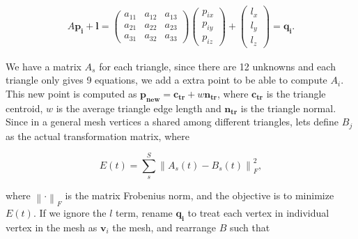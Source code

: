 \documentclass[12pt]{article}
\begin{document}
\begin{align*}
A \mathbf{p_i} + \mathbf{l} = \begin{pmatrix}
 a_{11} & a_{12} & a_{13} \\ 
 a_{21} & a_{22} & a_{23} \\ 
 a_{31} & a_{32}  & a_{33} 
\end{pmatrix} 
\begin{pmatrix}
 p_{ix} \\ 
 p_{iy} \\ 
 p_{iz} 
\end{pmatrix} +
\begin{pmatrix}
 l_x \\ 
 l_y \\ 
 l_z
\end{pmatrix} = \mathbf{q_i}.
\end{align*}

We have a matrix $A_{s}$ for each triangle, since there are 12 unknowns and each triangle only gives 9 equations, we add a extra point to be able to compute $A_i$.
This new point is computed as $\mathbf{p_{new}} = \mathbf{c_{tr}} + w\mathbf{n_{tr}}$, where $\mathbf{c_{tr}}$ is the triangle centroid, $w$ is the average triangle edge length and $\mathbf{n_{tr}}$ is the triangle normal. 
Since in a general mesh vertices a shared among different triangles, lets define $B_{j}$ as the actual transformation matrix, where

\begin{equation*}
E(t) = \sum_{s}^S \left \| A_s(t) - B_s(t) \right \|^2_F,
\end{equation*}

where $\left \| \cdot \right \|_F$ is the matrix Frobenius norm, and the objective is to minimize $E(t)$.
If we ignore the $l$ term, rename $\mathbf{q_i}$ to treat each vertex in individual vertex in the mesh as $\mathbf{v}_i$ the mesh, and rearrange $B$ such that
\end{document}

